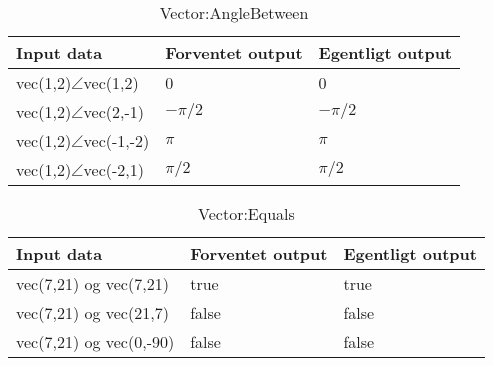 \begin{table}[!h]
	\caption{Vector:AngleBetween}
	\centering
	\begin{tabular}{L L L}
		\hline\hline
		Input data & Forventet output & Egentligt output \\ [0.5ex]
		\hline
		vec(1,2)$\angle$vec(1,2) & 0 & 0\\
		vec(1,2)$\angle$vec(2,-1) & $-\pi/2$ & $-\pi/2$\\
		vec(1,2)$\angle$vec(-1,-2) & $\pi$ & $\pi$\\
		vec(1,2)$\angle$vec(-2,1) & $\pi/2$ & $\pi/2$\\
		\hline
	\end{tabular}
\end{table}

\begin{table}[!h]
	\caption{Vector:Equals}
	\centering
	\begin{tabular}{L L L}
		\hline\hline
		Input data & Forventet output & Egentligt output \\ [0.5ex]
		\hline
		vec(7,21) og vec(7,21) & true & true\\
		vec(7,21) og vec(21,7) & false & false\\
		vec(7,21) og vec(0,-90) & false & false\\
		\hline
	\end{tabular}
\end{table}